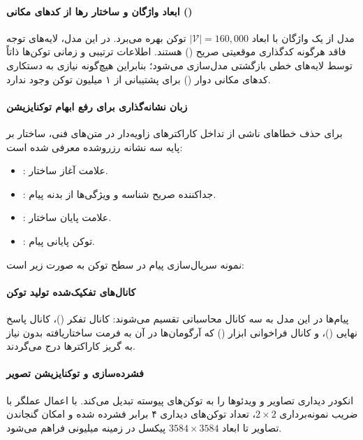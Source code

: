 \item {}

\paragraph*{ابعاد واژگان و ساختار رها از کدهای مکانی ()}
مدل  \cite{kimi2026k3} از یک واژگان با ابعاد $|\mathcal{V}| = 160{,}000$ توکن بهره می‌برد. در این مدل، لایه‌های توجه  فاقد هرگونه کدگذاری موقعیتی صریح () هستند. اطلاعات ترتیبی و زمانی توکن‌ها ذاتاً توسط لایه‌های خطی بازگشتی  مدل‌سازی می‌شود؛ بنابراین هیچ‌گونه نیازی به دستکاری کدهای مکانی دوار () برای پشتیبانی از ۱ میلیون توکن وجود ندارد.

\paragraph*{زبان نشانه‌گذاری  برای رفع ابهام توکنایزیشن}
برای حذف خطاهای ناشی از تداخل کاراکترهای زاویه‌دار در متن‌های فنی، ساختار  بر پایه سه نشانه رزروشده معرفی شده است:
\begin{itemize}
    \item \en{\texttt{[open]}}: علامت آغاز ساختار.
    \item \en{\texttt{[sep]}}: جداکننده صریح شناسه و ویژگی‌ها از بدنه پیام.
    \item \en{\texttt{[close]}}: علامت پایان ساختار.
    \item {}: توکن پایانی پیام.
\end{itemize}
نمونه سریال‌سازی پیام در سطح توکن به صورت زیر است:
\begin{center}
\scriptsize
{}
\end{center}

\paragraph*{کانال‌های تفکیک‌شده تولید توکن}
پیام‌ها در این مدل به سه کانال محاسباتی تقسیم می‌شوند: کانال تفکر ()، کانال پاسخ نهایی ()، و کانال فراخوانی ابزار () که آرگومان‌ها در آن به فرمت ساختاریافته بدون نیاز به گریز کاراکترها درج می‌گردند.

\paragraph*{فشرده‌سازی و توکنایزیشن تصویر}
انکودر دیداری  تصاویر و ویدئوها را به توکن‌های پیوسته تبدیل می‌کند. با اعمال عملگر  با ضریب نمونه‌برداری $2 \times 2$، تعداد توکن‌های دیداری ۴ برابر فشرده شده و امکان گنجاندن تصاویر تا ابعاد $3584 \times 3584$ پیکسل در زمینه میلیونی فراهم می‌شود.

